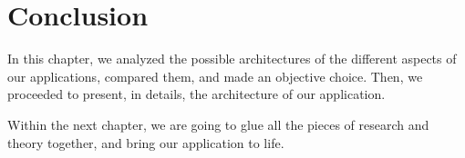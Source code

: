 \section{Conclusion}

In this chapter, we analyzed the possible architectures of the different aspects of our applications, compared them, and made an objective choice.
Then, we proceeded to present, in details, the architecture of our application.

Within the next chapter, we are going to glue all the pieces of research and theory together, and bring our application to life.

